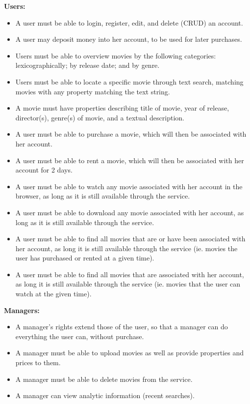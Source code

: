 \textbf{Users:}
\begin{itemize}
\item A user must be able to login, register, edit, and delete (CRUD) an account.
\item A user may deposit money into her account, to be used for later purchases.
\item Users must be able to overview movies by the following categories: lexicographically; by release date; and by genre.
\item Users must be able to locate a specific movie through text search, matching movies with any property matching the text string.
\item A movie must have properties describing title of movie, year of release, director(s), genre(s) of movie, and a textual description.
\item A user must be able to purchase a movie, which will then be associated with her account.
\item A user must be able to rent a movie, which will then be associated with her account for 2 days.
\item A user must be able to watch any movie associated with her account in the browser, as long as it is still available through the service.
\item A user must be able to download any movie associated with her account, as long as it is still available through the service.
\item A user must be able to find all movies that are or have been associated with her account, as long it is still available through the service (ie. movies the user has purchased or rented at a given time).
\item A user must be able to find all movies that are associated with her account, as long it is still available through the service (ie. movies that the user can watch at the given time).
\end{itemize}
\textbf{Managers:}
\begin{itemize}
\item A manager's rights extend those of the user, so that a manager can do everything the user can, without purchase.
\item A manager must be able to upload movies as well as provide properties and prices to them.
\item A manager must be able to delete movies from the service.
\item A manager can view analytic information (recent searches).
\end{itemize}

